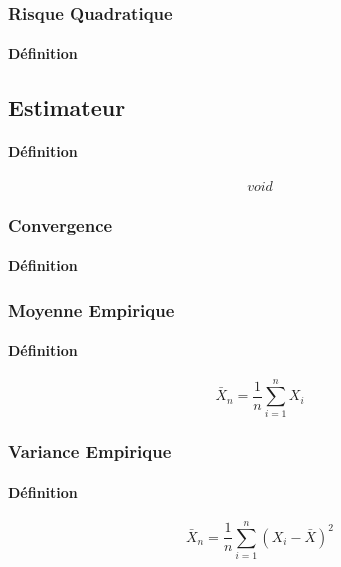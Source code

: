 \documentclass{article}
\begin{document}
\subsubsection{Risque Quadratique}
\paragraph{Définition}

\subsection{Estimateur}
\paragraph{Définition}
\begin{equation}
    \boxed{
        void
    }
\end{equation}

\subsubsection{Convergence}
\paragraph{Définition}

\subsubsection{Moyenne Empirique}
\paragraph{Définition}
\begin{equation}
    \boxed{
        \bar{X}_{n} = \frac{1}{n} \sum^{n}_{i=1} X_{i}
    }
\end{equation}

\subsubsection{Variance Empirique}
\paragraph{Définition}
\begin{equation}
    \boxed{
        \bar{X}_{n} = \frac{1}{n} \sum^{n}_{i=1} (X_{i} - \bar{X})^{2}
    }
\end{equation}
\end{document}
